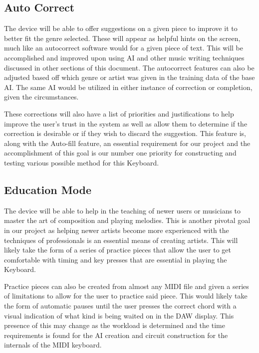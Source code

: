 \subsection{Auto Correct}

The device will be able to offer suggestions on a given piece to improve it to better fit
the genre selected. These will appear as helpful hints on the screen, much like an
autocorrect software would for a given piece of text. This will be accomplished and
improved upon using AI and other music writing techniques discussed in other sections of
this document. The autocorrect features can also be adjusted based off which genre or
artist was given in the training data of the base AI. The same AI would be utilized in
either instance of correction or completion, given the circumstances.

These corrections will also have a list of priorities and justifications to help improve
the user's trust in the system as well as allow them to determine if the correction is
desirable or if they wish to discard the suggestion. This feature is, along with the
Auto-fill feature, an essential requirement for our project and the accomplishment of this
goal is our number one priority for constructing and testing various possible method for
this Keyboard.

\subsection{Education Mode}

The device will be able to help in the teaching of newer users or musicians to master the
art of composition and playing melodies. This is another pivotal goal in our
project as helping newer artists become more experienced with the techniques of
professionals is an essential means of creating artists. This will likely take the form of
a series of practice pieces that allow the user to get comfortable with timing and key
presses that are essential in playing the Keyboard.

Practice pieces can also be created from almost any MIDI file and given a series of
limitations to allow for the user to practice said piece. This would likely take the form
of automatic pauses until the user presses the correct chord with a visual indication of
what kind is being waited on in the DAW display. This presence of this may change as the
workload is determined and the time requirements is found for the AI creation and circuit
construction for the internals of the MIDI keyboard.

